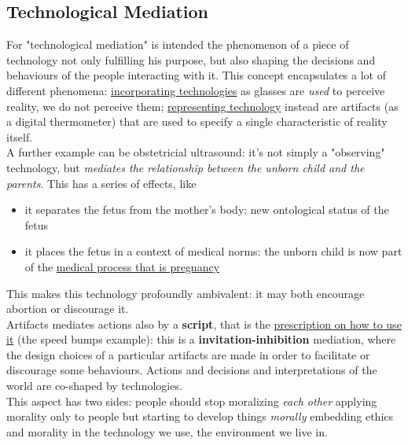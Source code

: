 \documentclass{article}
\begin{document}
		\subsection{Technological Mediation}
			For "technological mediation" is intended the phenomenon of a piece of technology not only fulfilling his purpose, but also shaping the decisions and behaviours of the people interacting with it. This concept encapsulates a lot of different phenomena: \underline{incorporating technologies} as glasses are \textit{used} to perceive reality, we do not perceive them; \underline{representing technology} instead are artifacts (as a digital thermometer) that are used to specify a single characteristic of reality itself.\\
			A further example can be obstetricial ultrasound: it's not simply a "observing" technology, but \textit{mediates the relationship between the unborn child and the parents}. This has a series of effects, like
			\begin{itemize}
				\item it separates the fetus from the mother's body: new ontological status of the fetus
				\item it places the fetus in a context of medical norms: the unborn child is now part of the \underline{medical process that is pregnancy}
			\end{itemize}
			This makes this technology profoundly ambivalent: it may both encourage abortion or discourage it.\\
			Artifacts mediates actions also by a \textbf{script}, that is the \underline{prescription on how to use it} (the speed bumps example): this is a \textbf{invitation-inhibition} mediation, where the design choices of a particular artifacts are made in order to facilitate or discourage some behaviours. Actions and decisions and interpretations of the world are co-shaped by technologies.\\
			This aspect has two sides: people should stop moralizing \textit{each other} applying morality only to people but starting to develop things \textit{morally} embedding ethics and morality in the technology we use, the environment we live in.
\end{document}
